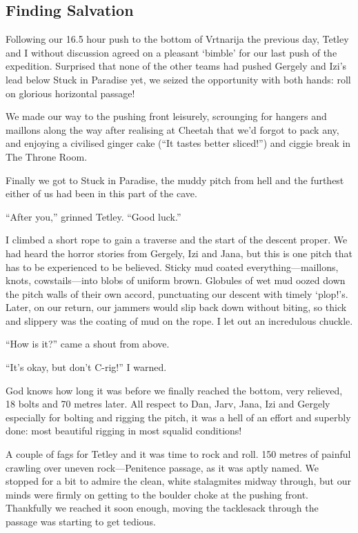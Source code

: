 
\subsection{Finding Salvation}\label{finding-salvation}

Following our 16.5 hour push to the bottom of Vrtnarija the previous
day, Tetley and I without discussion agreed on a pleasant `bimble' for
our last push of the expedition. Surprised that none of the other teams
had pushed Gergely and Izi's lead below Stuck in Paradise yet, we seized
the opportunity with both hands: roll on glorious horizontal passage!

We made our way to the pushing front leisurely, scrounging for hangers
and maillons along the way after realising at Cheetah that we'd forgot
to pack any, and enjoying a civilised ginger cake (``It tastes better
sliced!'') and ciggie break in The Throne Room.

Finally we got to Stuck in Paradise, the muddy pitch from hell and the
furthest either of us had been in this part of the cave.

``After you,'' grinned Tetley. ``Good luck.''

I climbed a short rope to gain a traverse and the start of the descent
proper. We had heard the horror stories from Gergely, Izi and Jana, but
this is one pitch that has to be experienced to be believed. Sticky mud
coated everything---maillons, knots, cowstails---into blobs of uniform
brown. Globules of wet mud oozed down the pitch walls of their own
accord, punctuating our descent with timely `plop!'s. Later, on our
return, our jammers would slip back down without biting, so thick and
slippery was the coating of mud on the rope. I let out an incredulous
chuckle.

``How is it?'' came a shout from above.

``It's okay, but don't C-rig!'' I warned.

God knows how long it was before we finally reached the bottom, very
relieved, 18 bolts and 70 metres later. All respect to Dan, Jarv, Jana,
Izi and Gergely especially for bolting and rigging the pitch, it was a
hell of an effort and superbly done: most beautiful rigging in most
squalid conditions!

A couple of fags for Tetley and it was time to rock and roll. 150 metres
of painful crawling over uneven rock---Penitence passage, as it was
aptly named. We stopped for a bit to admire the clean, white stalagmites
midway through, but our minds were firmly on getting to the boulder
choke at the pushing front. Thankfully we reached it soon enough, moving
the tacklesack through the passage was starting to get tedious.

